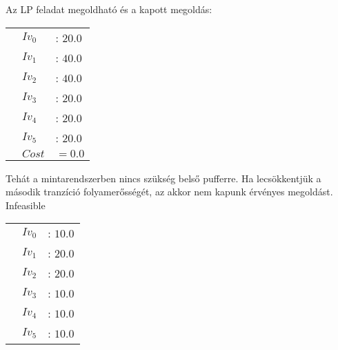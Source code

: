 Az LP feladat megoldható és a kapott megoldás:
\begin{center}
\begin{tabular}{rll}
&$Iv_0$ &: $20.0$\\
&$Iv_1$ &: $40.0$\\
&$Iv_2$ &: $40.0$\\
&$Iv_3$ &: $20.0$\\
&$Iv_4$ &: $20.0$\\
&$Iv_5$ &: $20.0$\\
&$Cost$ & $= 0.0$
\end{tabular}
\end{center}
Tehát a mintarendszerben nincs szükség belső pufferre. 
Ha lecsökkentjük a második tranzíció folyamerősségét, az akkor nem kapunk érvényes megoldást. \\
Infeasible
\begin{center}
\begin{tabular}{rll}
&$Iv_0$ &: $10.0$\\
&$Iv_1$ &: $20.0$\\
&$Iv_2$ &: $20.0$\\
&$Iv_3$ &: $10.0$\\
&$Iv_4$ &: $10.0$\\
&$Iv_5$ &: $10.0$
\end{tabular}
\end{center}
